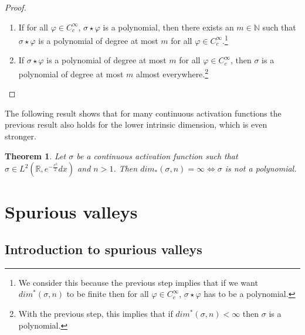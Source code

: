 \documentclass[11pt]{article} %
\newtheorem{theorem}{Theorem}[section]
\begin{document}
\begin{proof}
\begin{enumerate}
	\item If for all $\varphi \in C^\infty_c$, $\sigma \star \varphi$ is a polynomial, then there exists an $m \in \mathbb{N}$ such that $\sigma \star \varphi$ is a polynomial of degree at most $m$ for all $\varphi \in C^\infty_c$.\footnote{We consider this because the previous step implies that if we want $dim^*(\sigma, n)$ to be finite then for all $\varphi \in C^\infty_c$, $\sigma\star\varphi$ has to be a polynomial.}
	\item If $\sigma\star\varphi$ is a polynomial of degree at most $m$ for all $\varphi \in C^\infty_c$, then $\sigma$ is a polynomial of degree at most $m$ almost everywhere.\footnote{With the previous step, this implies that if $dim^*(\sigma, n) < \infty$ then $\sigma$ is a polynomial.}
\end{enumerate}
\end{proof}
The following result shows that for many continuous activation functions the previous result also holds for the lower intrinsic dimension, which is even stronger.
\begin{theorem}
Let $\sigma$ be a continuous activation function such that $\sigma \in L^2(\mathbb{R}, e^{-\frac{x^2}{2}}dx)$ and $n>1$. Then $dim_*(\sigma, n) = \infty \iff \sigma$ is not a polynomial.
\end{theorem}



\section{Spurious valleys}

\subsection{Introduction to spurious valleys}
\end{document}
